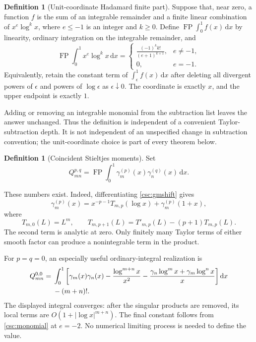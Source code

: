 \documentclass[11pt,a4paper]{article}
\numberwithin{equation}{section}
\theoremstyle{definition}
\newtheorem{definition}[theorem]{Definition}
\newcommand{\dd}{\,\mathrm dx}
\newcommand{\FP}{\operatorname{FP}}
\begin{document}
\begin{definition}[Unit-coordinate Hadamard finite part]\label{csc:FPdef}
Suppose that, near zero, a function $f$ is the sum of an integrable remainder and a finite linear combination of $x^e\log^k x$, where $e\le-1$ is an integer and $k\ge0$. Define $\FP\int_0^1 f(x)\dd$ by linearity, ordinary integration on the integrable remainder, and
\begin{equation}\label{csc:monomial}
\FP\int_0^1x^e\log^k x\dd=
\begin{cases}
\displaystyle\frac{(-1)^k k!}{(e+1)^{k+1}},&e\ne-1,\\[5pt]
0,&e=-1.
\end{cases}
\end{equation}
Equivalently, retain the constant term of $\int_\epsilon^1f(x)\dd$ after deleting all divergent powers of $\epsilon$ and powers of $\log\epsilon$ as $\epsilon\downarrow0$. The coordinate is exactly $x$, and the upper endpoint is exactly $1$.
\end{definition}
Adding or removing an integrable monomial from the subtraction list leaves the answer unchanged. Thus the definition is independent of a convenient Taylor-subtraction depth. It is not independent of an unspecified change in subtraction convention; the unit-coordinate choice is part of every theorem below.

\begin{definition}[Coincident Stieltjes moments]\label{csc:Qdef}
Set
\begin{equation}\label{csc:Q}
Q_{mn}^{p,q}=\FP\int_0^1\gamma_m^{(p)}(x)\gamma_n^{(q)}(x)\dd.
\end{equation}
\end{definition}
These numbers exist. Indeed, differentiating \eqref{csc:gmshift} gives
\begin{equation}\label{csc:localT}
\gamma_m^{(p)}(x)=x^{-p-1}T_{m,p}(\log x)+\gamma_m^{(p)}(1+x),
\end{equation}
where
\[
T_{m,0}(L)=L^m,\qquad T_{m,p+1}(L)=T'_{m,p}(L)-(p+1)T_{m,p}(L).
\]
The second term is analytic at zero. Only finitely many Taylor terms of either smooth factor can produce a nonintegrable term in the product.

For $p=q=0$, an especially useful ordinary-integral realization is
\begin{align}
Q_{mn}^{0,0}={}&\int_0^1\bigg[
\gamma_m(x)\gamma_n(x)-\frac{\log^{m+n}x}{x^2}
-\frac{\gamma_n\log^m x+\gamma_m\log^n x}{x}\bigg]\dd\notag\\
&-(m+n)! .\label{csc:ordinaryQ}
\end{align}
The displayed integral converges: after the singular products are removed, its local terms are $O(1+|\log x|^{m+n})$. The final constant follows from \eqref{csc:monomial} at $e=-2$. No numerical limiting process is needed to define the value.
\end{document}
